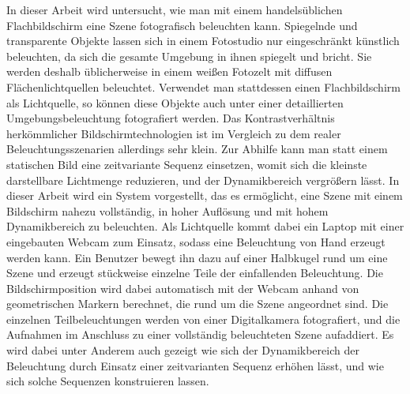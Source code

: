 In dieser Arbeit wird untersucht, wie man mit einem handelsüblichen Flachbildschirm eine Szene fotografisch beleuchten kann.
Spiegelnde und transparente Objekte lassen sich in einem Fotostudio nur eingeschränkt künstlich beleuchten, da sich die gesamte Umgebung in ihnen spiegelt und bricht.
Sie werden deshalb üblicherweise in einem weißen Fotozelt mit diffusen Flächenlichtquellen beleuchtet.
Verwendet man stattdessen einen Flachbildschirm als Lichtquelle, so können diese Objekte auch unter einer detaillierten Umgebungsbeleuchtung fotografiert werden.
Das Kontrastverhältnis herkömmlicher Bildschirmtechnologien ist im Vergleich zu dem realer Beleuchtungsszenarien allerdings sehr klein. 
Zur Abhilfe kann man statt einem statischen Bild eine zeitvariante Sequenz einsetzen, womit sich die kleinste darstellbare Lichtmenge reduzieren, und der Dynamikbereich vergrößern lässt.
In dieser Arbeit wird ein System vorgestellt, das es ermöglicht, eine Szene mit einem Bildschirm nahezu vollständig, in hoher Auflösung und mit hohem Dynamikbereich zu beleuchten.
Als Lichtquelle kommt dabei ein Laptop mit einer eingebauten Webcam zum Einsatz, sodass eine Beleuchtung von Hand erzeugt werden kann.
Ein Benutzer bewegt ihn dazu auf einer Halbkugel rund um eine Szene und erzeugt stückweise einzelne Teile der einfallenden Beleuchtung.
Die Bildschirmposition wird dabei automatisch mit der Webcam anhand von geometrischen Markern berechnet, die rund um die Szene angeordnet sind.
Die einzelnen Teilbeleuchtungen werden von einer Digitalkamera fotografiert, und die Aufnahmen im Anschluss zu einer vollständig beleuchteten Szene aufaddiert.
Es wird dabei unter Anderem auch gezeigt wie sich der Dynamikbereich der Beleuchtung durch Einsatz einer zeitvarianten Sequenz erhöhen lässt, und wie sich solche Sequenzen konstruieren lassen.

